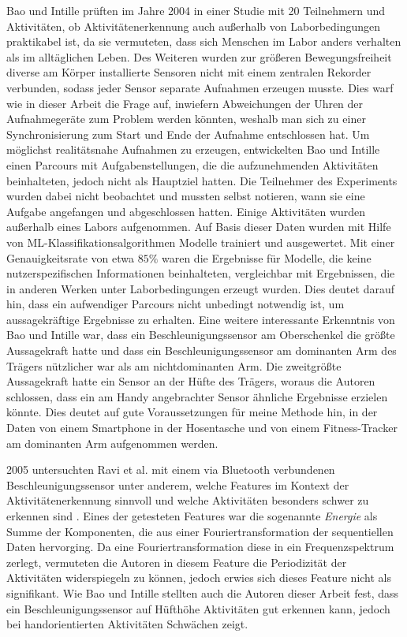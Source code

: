 Bao und Intille prüften im Jahre 2004 in einer Studie mit 20 Teilnehmern und Aktivitäten, ob Aktivitätenerkennung auch außerhalb von Laborbedingungen praktikabel ist, da sie vermuteten, dass sich Menschen im Labor anders verhalten als im alltäglichen Leben. Des Weiteren wurden zur größeren Bewegungsfreiheit diverse am Körper installierte Sensoren nicht mit einem zentralen Rekorder verbunden, sodass jeder Sensor separate Aufnahmen erzeugen musste. Dies warf wie in dieser Arbeit die Frage auf, inwiefern Abweichungen der Uhren der Aufnahmegeräte zum Problem werden könnten, weshalb man sich zu einer Synchronisierung zum Start und Ende der Aufnahme entschlossen hat.
Um möglichst realitätsnahe Aufnahmen zu erzeugen, entwickelten Bao und Intille einen Parcours mit Aufgabenstellungen, die die aufzunehmenden Aktivitäten beinhalteten, jedoch nicht als Hauptziel hatten. Die Teilnehmer des Experiments wurden dabei nicht beobachtet und mussten selbst notieren, wann sie eine Aufgabe angefangen und abgeschlossen hatten. Einige Aktivitäten wurden außerhalb eines Labors aufgenommen. Auf Basis dieser Daten wurden mit Hilfe von \ac{ML}-Klassifikationsalgorithmen Modelle trainiert und ausgewertet. Mit einer Genauigkeitsrate von etwa $85 \%$ waren die Ergebnisse für Modelle, die keine nutzerspezifischen Informationen beinhalteten, vergleichbar mit Ergebnissen, die in anderen Werken unter Laborbedingungen erzeugt wurden. Dies deutet darauf hin, dass ein aufwendiger Parcours nicht unbedingt notwendig ist, um aussagekräftige Ergebnisse zu erhalten.
Eine weitere interessante Erkenntnis von Bao und Intille war, dass ein Beschleunigungssensor am Oberschenkel die größte Aussagekraft hatte und dass ein Beschleunigungssensor am dominanten Arm des Trägers nützlicher war als am nichtdominanten Arm. Die zweitgrößte Aussagekraft hatte ein Sensor an der Hüfte des Trägers, woraus die Autoren schlossen, dass ein am Handy angebrachter Sensor ähnliche Ergebnisse erzielen könnte. Dies deutet auf gute Voraussetzungen für meine Methode hin, in der Daten von einem Smartphone in der Hosentasche und von einem Fitness-Tracker am dominanten Arm aufgenommen werden.

2005 untersuchten Ravi et al. mit einem via Bluetooth verbundenen Beschleunigungssensor unter anderem, welche Features im Kontext der Aktivitätenerkennung sinnvoll und welche Aktivitäten besonders schwer zu erkennen sind \cite{Ravi2005}. Eines der getesteten Features war die sogenannte \textit{Energie} als Summe der Komponenten, die aus einer Fouriertransformation der sequentiellen Daten hervorging. Da eine Fouriertransformation diese in ein Frequenzspektrum zerlegt, vermuteten die Autoren in diesem Feature die Periodizität der Aktivitäten widerspiegeln zu können, jedoch erwies sich dieses Feature nicht als signifikant. Wie Bao und Intille stellten auch die Autoren dieser Arbeit fest, dass ein Beschleunigungssensor auf Hüfthöhe Aktivitäten gut erkennen kann, jedoch bei handorientierten Aktivitäten Schwächen zeigt.


